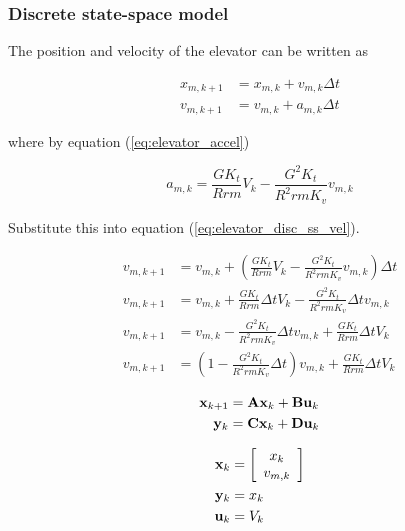 \subsubsection{Discrete state-space model}

The position and velocity of the elevator can be written as

\begin{align}
  x_{m,k+1} &= x_{m,k} + v_{m,k} \Delta t \label{eq:elevator_disc_ss_pos} \\
  v_{m,k+1} &= v_{m,k} + a_{m,k} \Delta t \label{eq:elevator_disc_ss_vel}
\end{align}

where by equation (\ref{eq:elevator_accel})

\begin{equation*}
  a_{m,k} = \frac{GK_t}{Rrm} V_k - \frac{G^2 K_t}{R^2 rm K_v} v_{m,k}
\end{equation*}

Substitute this into equation (\ref{eq:elevator_disc_ss_vel}).

\begin{align}
  v_{m,k+1} &= v_{m,k} + \left(\frac{GK_t}{Rrm} V_k -
    \frac{G^2 K_t}{R^2 rm K_v} v_{m,k}\right) \Delta t \nonumber \\
  v_{m,k+1} &= v_{m,k} + \frac{GK_t}{Rrm} \Delta t V_k -
    \frac{G^2 K_t}{R^2 rm K_v} \Delta t v_{m,k} \nonumber \\
  v_{m,k+1} &= v_{m,k} - \frac{G^2 K_t}{R^2 rm K_v} \Delta t v_{m,k} +
    \frac{GK_t}{Rrm} \Delta t V_k \nonumber \\
  v_{m,k+1} &= \left(1 - \frac{G^2 K_t}{R^2 rm K_v} \Delta t\right) v_{m,k} +
    \frac{GK_t}{Rrm} \Delta t V_k
\end{align}

\begin{align*}
  \mathbf{x}_{k+1} &= \mathbf{A} \mathbf{x}_k + \mathbf{B} \mathbf{u}_k \\
  \mathbf{y}_k &= \mathbf{C} \mathbf{x}_k + \mathbf{D} \mathbf{u}_k
\end{align*}

\begin{align*}
  \mathbf{x}_k &= \left[
  \begin{array}{c}
    x_k \\
    v_{m,k}
  \end{array}
  \right] \\
  \mathbf{y}_k &= x_k \\
  \mathbf{u}_k &= V_k
\end{align*}

